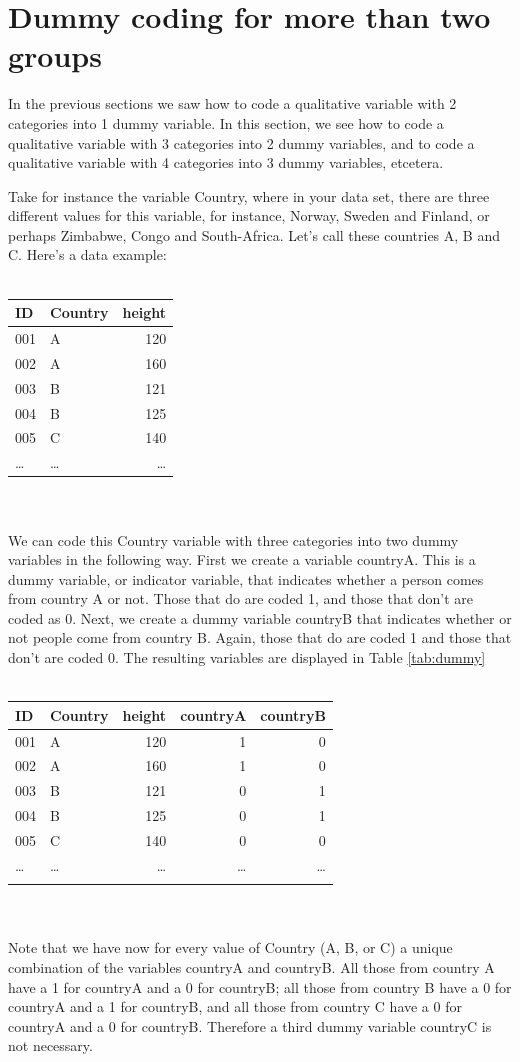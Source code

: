 \documentclass[]{report}\usepackage[]{graphicx}\usepackage[]{color}
\begin{document}
\section{Dummy coding for more than two groups}

In the previous sections we saw how to code a qualitative variable with 2 categories into 1 dummy variable. In this section, we see how to code a qualitative variable with 3 categories into 2 dummy variables, and to code a qualitative variable with 4 categories into 3 dummy variables, etcetera. 

Take for instance the variable Country, where in your data set, there are three different values for this variable, for instance, Norway, Sweden and Finland, or perhaps Zimbabwe, Congo and South-Africa. Let's call these countries A, B and C. Here's a data example:
 \\
 \\
 \begin{tabular}{llr}
 ID & Country &  height\\ \hline
  001 &A & 120\\
  002 &A & 160\\
  003 &B & 121\\
  004 &B & 125\\
  005 &C & 140\\
  \dots & \dots & \dots\\
 \end{tabular}
\\
\\
We can code this Country variable with three categories into two dummy variables in the following way. First we create a variable countryA. This is a dummy variable, or indicator variable, that indicates whether a person comes from country A or not. Those that do are coded 1, and those that don't are coded as 0. Next, we create a dummy variable countryB that indicates whether or not people come from country B. Again, those that do are coded 1 and those that don't are coded 0. The resulting variables are displayed in Table \ref{tab:dummy}
 \\
 \\
 \begin{tabular}{llrrr}
 ID & Country &  height & countryA & countryB \\ \hline
  001 &A & 120 & 1 & 0\\
  002 &A & 160 & 1 & 0\\
  003 &B & 121 & 0 & 1\\
  004 &B & 125 & 0 & 1\\
  005 &C & 140 & 0 & 0\\
  \dots & \dots & \dots& \dots & \dots\\
  \label{tab:dummy}
 \end{tabular}
\\
\\
Note that we have now for every value of Country (A, B, or C) a unique combination of the variables countryA and countryB. All those from country A have a 1 for countryA and a 0 for countryB; all those from country B have a 0 for countryA and a 1 for countryB, and all those from country C have a 0 for countryA and a 0 for countryB. Therefore a third dummy variable countryC is not necessary. 
\end{document}
